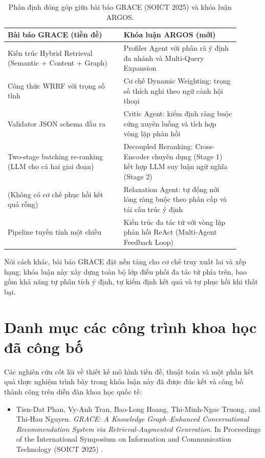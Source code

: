 \begin{table}[H]
  \centering
  \caption{Phân định đóng góp giữa bài báo GRACE (SOICT 2025) và khóa luận ARGOS.}
  \begin{tabular}{p{0.45\linewidth} p{0.45\linewidth}}
    \toprule
    \textbf{Bài báo GRACE (tiền đề)} & \textbf{Khóa luận ARGOS (mới)} \\
    \midrule
    Kiến trúc Hybrid Retrieval (Semantic + Content + Graph) & Profiler Agent với phân rã ý định đa nhánh và Multi-Query Expansion \\
    \addlinespace
    Công thức WRRF với trọng số tĩnh & Cơ chế Dynamic Weighting: trọng số thích nghi theo ngữ cảnh hội thoại \\
    \addlinespace
    Validator JSON schema đầu ra & Critic Agent: kiểm định ràng buộc cứng xuyên luồng và tích hợp vòng lặp phản hồi \\
    \addlinespace
    Two-stage batching re-ranking (LLM cho cả hai giai đoạn) & Decoupled Reranking: Cross-Encoder chuyên dụng (Stage 1) kết hợp LLM suy luận ngữ nghĩa (Stage 2) \\
    \addlinespace
    (Không có cơ chế phục hồi kết quả rỗng) & Relaxation Agent: tự động nới lỏng ràng buộc theo phân cấp và tái cấu trúc ý định \\
    \addlinespace
    Pipeline tuyến tính một chiều & Kiến trúc đa tác tử với vòng lặp phản hồi ReAct (Multi-Agent Feedback Loop) \\
    \bottomrule
  \end{tabular}
\end{table}

Nói cách khác, bài báo GRACE đặt nền tảng cho cơ chế truy xuất lai và xếp hạng; khóa luận này xây dựng toàn bộ lớp điều phối đa tác tử phía trên, bao gồm khả năng tự phân tích ý định, tự kiểm định kết quả và tự phục hồi khi thất bại.

\section{Danh mục các công trình khoa học đã công bố}

Các nghiên cứu cốt lõi về thiết kế mô hình tiền đề, thuật toán và một phần kết quả thực nghiệm trình bày trong khóa luận này đã được đúc kết và công bố thành công trên diễn đàn khoa học quốc tế:

\begin{itemize}
  \item Tien-Dat Phan, Vy-Anh Tran, Bao-Long Hoang, Thi-Minh-Ngoc Truong, and Thi-Hau Nguyen. \textit{GRACE: A Knowledge Graph--Enhanced Conversational Recommendation System via Retrieval-Augmented Generation}. In Proceedings of the International Symposium on Information and Communication Technology (SOICT 2025) \cite{phan2025grace}.

\end{itemize}